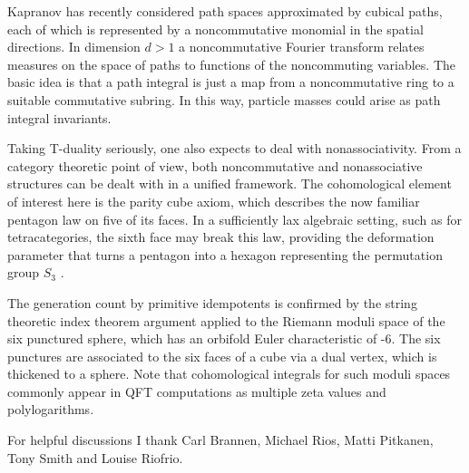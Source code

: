 \documentclass[aps,prl,onecolumn,showpacs,address,11pt]{revtex4}
\begin{document}
Kapranov \cite{KapranovFT} has recently considered path spaces
approximated by cubical paths, each of which is represented by a
noncommutative monomial in the spatial directions. In dimension $d
> 1$ a noncommutative Fourier transform relates measures on the
space of paths to functions of the noncommuting variables. The
basic idea is that a path integral is just a map from a
noncommutative ring to a suitable commutative subring. In this
way, particle masses \cite{Brannen} could arise as path integral
invariants.

Taking T-duality seriously, one also expects to deal with
nonassociativity. From a category theoretic point of view, both
noncommutative and nonassociative structures can be dealt with in
a unified framework. The cohomological element of interest here is
the parity cube axiom, which describes the now familiar pentagon
law on five of its faces. In a sufficiently lax algebraic setting,
such as for tetracategories, the sixth face may break this law,
providing the deformation parameter that turns a pentagon into a
hexagon representing the permutation group $S_3$
\cite{BataninComb}.

The generation count by primitive idempotents \cite{Brannen} is
confirmed by the string theoretic index theorem argument applied
to the Riemann moduli space of the six punctured sphere, which has
an orbifold Euler characteristic \cite{MulasePenk} of -6. The six
punctures are associated to the six faces of a cube via a dual
vertex, which is thickened to a sphere. Note that cohomological
integrals for such moduli spaces commonly appear in QFT
computations as multiple zeta values and polylogarithms.

\begin{acknowledgments} For helpful discussions I thank Carl
Brannen, Michael Rios, Matti Pitkanen, Tony Smith and Louise
Riofrio. \end{acknowledgments}
\end{document}
